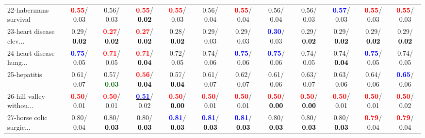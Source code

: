 \begin{table}[h]
\begin{center}
{\begin{tabular}{lc|c|c|c|c|c|c|c|c|c|c}
22-habermans survival & \textcolor{red}{\textbf{  0.55}}/  0.03 &   0.56/  0.03 & \textcolor{red}{\textbf{  0.55}}/\textcolor{black}{\textbf{  0.02}} & \textcolor{red}{\textbf{  0.55}}/  0.03 &   0.56/  0.04 & \textcolor{red}{\textbf{  0.55}}/  0.04 &   0.56/  0.04 &   0.56/  0.03 & \textcolor{blue}{\textbf{  0.57}}/  0.03 & \textcolor{red}{\textbf{  0.55}}/  0.03 & \textcolor{red}{\textbf{  0.55}}/  0.03 \\
23-heart disease clev... &   0.29/\textcolor{black}{\textbf{  0.02}} & \textcolor{red}{\textbf{  0.27}}/\textcolor{black}{\textbf{  0.02}} & \textcolor{red}{\textbf{  0.27}}/\textcolor{black}{\textbf{  0.02}} &   0.28/\textcolor{black}{\textbf{  0.02}} &   0.29/  0.03 &   0.29/  0.03 & \textcolor{blue}{\textbf{  0.30}}/  0.03 &   0.29/\textcolor{black}{\textbf{  0.02}} &   0.29/\textcolor{black}{\textbf{  0.02}} &   0.29/\textcolor{black}{\textbf{  0.02}} &   0.29/\textcolor{black}{\textbf{  0.02}} \\
24-heart disease hung... & \textcolor{blue}{\textbf{  0.75}}/  0.05 & \textcolor{red}{\textbf{  0.71}}/  0.05 & \textcolor{red}{\textbf{  0.71}}/\textcolor{black}{\textbf{  0.04}} &   0.72/  0.05 &   0.74/  0.06 & \textcolor{blue}{\textbf{  0.75}}/  0.06 & \textcolor{blue}{\textbf{  0.75}}/  0.06 &   0.74/  0.05 &   0.74/\textcolor{black}{\textbf{  0.04}} & \textcolor{blue}{\textbf{  0.75}}/  0.05 &   0.74/  0.05 \\
25-hepatitis &   0.61/  0.07 &   0.57/\textcolor{darkgreen}{\textbf{  0.03}} & \textcolor{red}{\textbf{  0.56}}/\textcolor{black}{\textbf{  0.04}} &   0.57/\textcolor{black}{\textbf{  0.04}} &   0.61/  0.07 &   0.62/  0.07 &   0.61/  0.06 &   0.63/  0.07 &   0.63/  0.06 &   0.64/  0.06 & \textcolor{blue}{\textbf{  0.65}}/  0.06 \\
26-hill valley withou... & \textcolor{red}{\textbf{  0.50}}/  0.01 & \textcolor{red}{\textbf{  0.50}}/  0.01 & \underline{\textcolor{blue}{\textbf{  0.51}}}/  0.02 & \textcolor{red}{\textbf{  0.50}}/\textcolor{black}{\textbf{  0.00}} & \textcolor{red}{\textbf{  0.50}}/  0.01 & \textcolor{red}{\textbf{  0.50}}/  0.01 & \textcolor{red}{\textbf{  0.50}}/\textcolor{black}{\textbf{  0.00}} & \textcolor{red}{\textbf{  0.50}}/\textcolor{black}{\textbf{  0.00}} & \textcolor{red}{\textbf{  0.50}}/  0.01 & \textcolor{red}{\textbf{  0.50}}/  0.01 & \textcolor{red}{\textbf{  0.50}}/  0.02 \\
27-horse colic surgic... &   0.80/  0.04 &   0.80/\textcolor{black}{\textbf{  0.03}} &   0.80/\textcolor{black}{\textbf{  0.03}} & \textcolor{blue}{\textbf{  0.81}}/\textcolor{black}{\textbf{  0.03}} & \textcolor{blue}{\textbf{  0.81}}/\textcolor{black}{\textbf{  0.03}} & \textcolor{blue}{\textbf{  0.81}}/\textcolor{black}{\textbf{  0.03}} &   0.80/\textcolor{black}{\textbf{  0.03}} &   0.80/\textcolor{black}{\textbf{  0.03}} &   0.80/\textcolor{black}{\textbf{  0.03}} & \textcolor{red}{\textbf{  0.79}}/  0.04 & \textcolor{red}{\textbf{  0.79}}/  0.04 \\

\end{tabular}}
\end{center}
\end{table}
